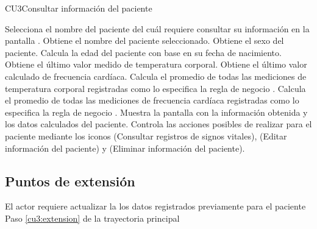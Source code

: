 \begin{UseCase}{CU3}{Consultar información del paciente}
	
\end{UseCase}

\begin{UCtrayectoria}
	\UCpaso[\UCactor] Selecciona el nombre del paciente del cuál requiere consultar su información en la pantalla .
	\UCpaso[\UCsist] Obtiene el nombre del paciente seleccionado.
	\UCpaso[\UCsist] Obtiene el sexo del paciente.
	\UCpaso[\UCsist] Calcula la edad del paciente con base en  su fecha de nacimiento.
	\UCpaso[\UCsist] Obtiene el último valor medido de temperatura corporal.
	\UCpaso[\UCsist] Obtiene el último valor calculado de frecuencia cardíaca.
	\UCpaso[\UCsist] Calcula el promedio de todas las mediciones de temperatura corporal registradas como lo especifica la regla de negocio .
	\UCpaso[\UCsist] Calcula el promedio de todas las mediciones de frecuencia cardíaca registradas como lo especifica la regla de negocio .
	\UCpaso[\UCsist] Muestra la pantalla  con la información obtenida y los datos calculados del paciente.
	\UCpaso[\UCactor] \label{cu3:extension}Controla las acciones posibles de realizar para el paciente mediante los iconos \btnMonitoreo{}(Consultar registros de signos vitales), \btnEditar{} (Editar información del paciente) y \btnEliminar{} (Eliminar información del paciente).
\end{UCtrayectoria}


\subsection{Puntos de extensión}
\UCExtensionPoint
{El actor requiere actualizar la los datos registrados previamente para el paciente}
{Paso \ref{cu3:extension} de la trayectoria principal}
{}


